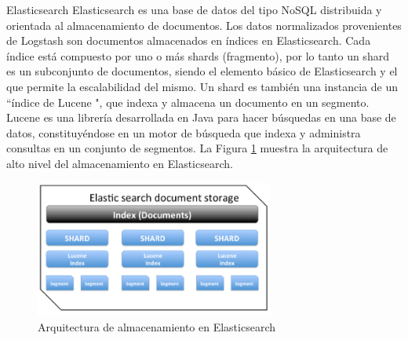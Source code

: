    \begin{subsection}{Elasticsearch}
        Elasticsearch es una base de datos del tipo NoSQL distribuida y orientada al almacenamiento de documentos. Los datos normalizados provenientes de Logstash son documentos almacenados en índices en Elasticsearch. Cada índice está compuesto por uno o más shards (fragmento), por lo tanto un shard es un subconjunto de documentos, siendo el elemento básico de Elasticsearch y el que permite la escalabilidad del mismo. Un shard es también una instancia de un “índice de Lucene \cite{lucene}", que indexa y almacena un documento en un segmento. Lucene es una librería desarrollada en Java para hacer búsquedas en una base de datos, constituyéndose en un motor de búsqueda que indexa y administra consultas en un conjunto de segmentos. La Figura \ref{fig:figura_21_arq_alm_elasticsearch} muestra la arquitectura de alto nivel del almacenamiento en Elasticsearch.
        
        \begin{figure}[H]
            \centering
            \includegraphics[width=0.7\textwidth]{./iteracion_1_imagenes/figura_21_arq_alm_elasticsearch.png}
            \caption{Arquitectura de almacenamiento en Elasticsearch}
            \label{fig:figura_21_arq_alm_elasticsearch}
        \end{figure}
    \end{subsection}
    \pagebreak
